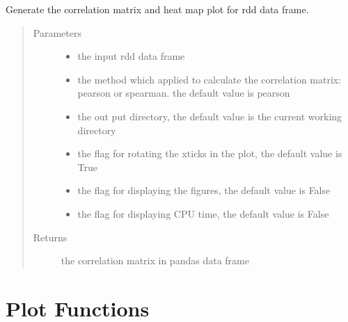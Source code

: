 \documentclass[letterpaper,12pt,english]{sphinxmanual}
\begin{document}
\begin{fulllineitems}
Generate the correlation matrix and heat map plot for rdd data frame.
\begin{quote}\begin{description}
\item[{Parameters}] \leavevmode\begin{itemize}
\item {} 
 \textendash{} the input rdd data frame

\item {} 
 \textendash{} the method which applied to calculate the correlation matrix: pearson or spearman.
the default value is pearson

\item {} 
 \textendash{} the out put directory, the default value is the current working directory

\item {} 
 \textendash{} the flag for rotating the xticks in the plot, the default value is True

\item {} 
 \textendash{} the flag for displaying the figures, the default value is False

\item {} 
 \textendash{} the flag for displaying CPU time, the default value is False

\end{itemize}

\item[{Returns}] \leavevmode
the correlation matrix in pandas data frame

\end{description}\end{quote}

\end{fulllineitems}



\section{Plot Functions}
\label{\detokenize{basics:plot-functions}}
\end{document}
